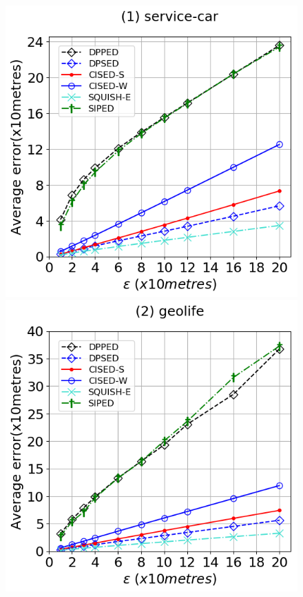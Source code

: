 {\begin{figure}[tb!]
\centering
\includegraphics[scale = 0.295]{Figures/Exp-query-ae-epsilon-service.png}\hspace{1ex}
\includegraphics[scale = 0.295]{Figures/Exp-query-ae-epsilon-geolife.png}\hspace{1ex}

\end{figure}}
